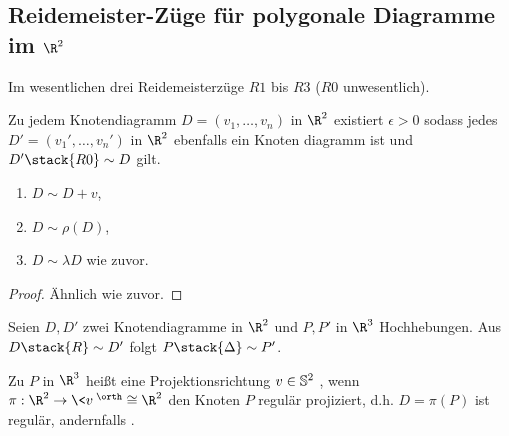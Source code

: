 \subsection{Reidemeister-Züge für polygonale Diagramme im \texorpdfstring{$\R^2$}{ℝ²}}


Im wesentlichen drei Reidemeisterzüge $R1$ bis $R3$ ($R0$ unwesentlich).

\begin{lem}
    Zu jedem Knotendiagramm $D = (v_1, \dotsc, v_n)$ in $\R^2$ existiert $\epsilon > 0$ sodass jedes $D' = (v_1', \dotsc, v_n')$ in $\R^2$ ebenfalls ein Knoten diagramm ist und $D' \stack{R0}\sim D$ gilt.
    \begin{enumerate}[(1)]
        \item
            $D \sim D + v$,
        \item
            $D \sim \rho(D)$,
        \item
            $D \sim \lambda D$ wie zuvor.
    \end{enumerate}
    \begin{proof}
        Ähnlich wie zuvor.
    \end{proof}
\end{lem}

\begin{lem}
    Seien $D, D'$ zwei Knotendiagramme in $\R^2$ und $P, P'$ in $\R^3$ Hochhebungen.
    Aus $D \stack{R}\sim D'$ folgt $P \stack{\Delta}\sim P'$.
\end{lem}

\begin{df}
    Zu $P$ in $\R^3$ heißt eine Projektionsrichtung $v \in \S^2$ , wenn $\pi: \R^2 \to \<v\>^\orth \homeomorphic \R^2$ den Knoten $P$ regulär projiziert, d.h. $D = \pi(P)$ ist regulär, andernfalls .
\end{df}

